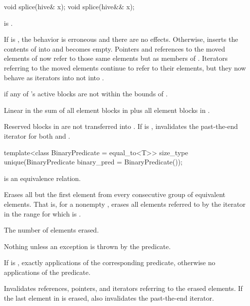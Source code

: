 %
\begin{itemdecl}
void splice(hive& x);
void splice(hive&& x);
\end{itemdecl}

\begin{itemdescr}
\pnum
\expects
{} is .

\pnum
\effects
If  is ,
the behavior is erroneous and there are no effects.
Otherwise, inserts the contents of  into  and
 becomes empty.
Pointers and references to the moved elements of 
now refer to those same elements but as members of .
Iterators referring to the moved elements continue to refer to their elements,
but they now behave as iterators into  not into .

\pnum
\throws
{} if any of 's active blocks
are not within the bounds of .

\pnum
\complexity
Linear in the sum of
all element blocks in  plus all element blocks in .

\pnum
\remarks
Reserved blocks in  are not transferred into .
If  is ,
invalidates the past-the-end iterator for both  and .
\end{itemdescr}

%
\begin{itemdecl}
template<class BinaryPredicate = equal_to<T>>
  size_type unique(BinaryPredicate binary_pred = BinaryPredicate());
\end{itemdecl}

\begin{itemdescr}
\pnum
\expects
{} is an equivalence relation.

\pnum
\effects
Erases all but the first element
from every consecutive group of equivalent elements.
That is, for a nonempty ,
erases all elements referred to by the iterator 
in the range 
for which  is .

\pnum
\returns
The number of elements erased.

\pnum
\throws
Nothing unless an exception is thrown by the predicate.

\pnum
\complexity
If  is ,
exactly  applications of the corresponding predicate,
otherwise no applications of the predicate.

\pnum
\remarks
Invalidates references, pointers, and iterators
referring to the erased elements.
If the last element in  is erased,
also invalidates the past-the-end iterator.
\end{itemdescr}

